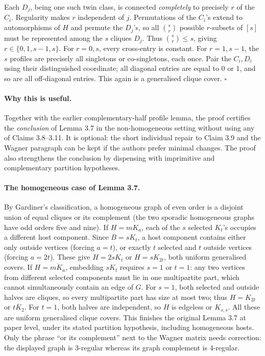 \documentclass[11pt,a4paper]{article}
\begin{document}
Each \(D_j\), being one such twin
class, is connected \emph{completely}
to precisely \(r\) of the \(C_i\).
Regularity makes \(r\) independent
of \(j\). Permutations of the
\(C_i\)'s extend to automorphisms
of \(H\) and permute the \(D_j\)'s,
so all \(\binom sr\) possible
\(r\)-subsets of \([s]\) must be
represented among the \(s\) cliques
\(D_j\). Thus \(\binom sr\le s\),
giving \(r\in\{0,1,s-1,s\}\).
For \(r=0,s\), every cross-entry is
constant. For \(r=1,s-1\), the
\(s\) profiles are precisely all
singletons or co-singletons, each
once. Pair the \(C_i,D_i\)
using their distinguished coordinate;
all diagonal entries are equal to
\(0\) or \(1\), and so are all
off-diagonal entries. This again is a
generalised clique cover. \(\square\)

\paragraph{Why this is useful.}
Together with the earlier complementary-half
profile lemma, the proof certifies the
\emph{conclusion} of Lemma 3.7 in
the non-homogeneous setting without using
any of Claims 3.8--3.11.
It is optional: the short individual repair
to Claim 3.9 and the Wagner paragraph can be
kept if the authors prefer minimal changes.
The proof also strengthens the conclusion
by dispensing with imprimitive and complementary
partition hypotheses.

\paragraph{The homogeneous case of Lemma 3.7.}
By Gardiner's classification, a homogeneous graph of even order is
a disjoint union of equal cliques or its complement (the two sporadic
homogeneous graphs have odd orders five and nine).
If \(H=mK_a\), each of the \(s\) selected \(K_t\)'s occupies
a different host component. Since \(B=sK_t\), a host component
contains either only outside vertices (forcing \(a=t\)), or
exactly \(t\) selected and \(t\) outside vertices
(forcing \(a=2t\)). These give \(H=2sK_t\) or
\(H=sK_{2t}\), both uniform generalised covers.
If \(H=\overline{mK_a}\), embedding \(sK_t\) requires
\(s=1\) or \(t=1\): any two vertices from different
selected components must lie in one multipartite part,
which cannot simultaneously contain an edge of \(G\).
For \(s=1\), both selected and outside halves are cliques,
so every multipartite part has size at most two;
thus \(H=K_{2t}\) or \(\overline{tK_2}\).
For \(t=1\), both halves are independent,
so \(H\) is edgeless or \(K_{s,s}\).
All these are uniform generalised clique covers.
This finishes the original Lemma 3.7 at paper level,
under its stated partition hypothesis, including homogeneous hosts.
Only the phrase ``or its complement'' next to the Wagner
matrix needs correction: the displayed graph is 3-regular
whereas its graph complement is 4-regular.
\end{document}
